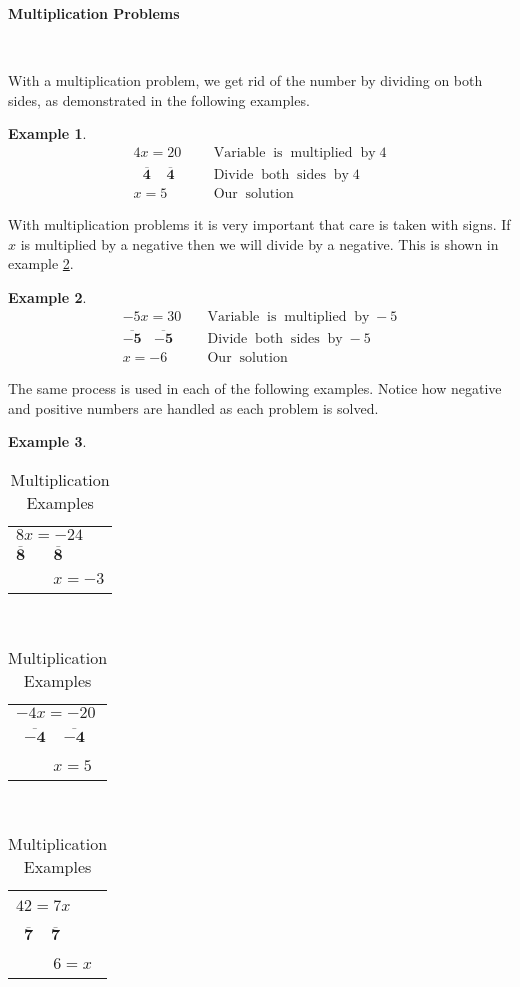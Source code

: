 \documentclass[11pt]{book}
\newcommand{\tmmathbf}[1]{\ensuremath{\boldsymbol{#1}}}
\newcommand{\tmop}[1]{\ensuremath{\operatorname{#1}}}
\theoremstyle{definition}  %
\newtheorem{example}{Example}[chapter]
\begin{document}
{\textbf{Multiplication Problems}}\par
~\par
With a multiplication problem, we get rid of the number by dividing on both
sides, as demonstrated in the following examples.

\begin{example}\label{Lin8}
  \begin{eqnarray*}
    4 x = 20 ~~&  & \tmop{Variable} \tmop{is} \tmop{multiplied} \tmop{by} 4\\
    ~~~\tmmathbf{\overline{4} ~~~~~ \overline{4}}~~ &  & \tmop{Divide} \tmop{both}
    \tmop{sides} \tmop{by} 4\\
    x = 5~~ &  & \tmop{Our} \tmop{solution}
  \end{eqnarray*}
\end{example}

With multiplication problems it is very important that care is taken with
signs. If $x$ is multiplied by a negative then we will divide by a negative.
This is shown in example \ref{Lin9}.

\begin{example}\label{Lin9}
  \begin{eqnarray*}
    - 5 x = 30 &  & \tmop{Variable} \tmop{is} \tmop{multiplied} \tmop{by} -
    5\\
    \tmmathbf{\overline{- 5} ~~~~ \overline{- 5}} &  & \tmop{Divide} \tmop{both}
    \tmop{sides} \tmop{by} - 5\\
    x = - 6 &  & \tmop{Our} \tmop{solution}
  \end{eqnarray*}
\end{example}

The same process is used in each of the following examples. Notice how
negative and positive numbers are handled as each problem is solved.

\begin{example}\label{Lin10}
~\end{example}
 
 \begin{table}[h]
    \begin{tabular}{l}
      $8 x = - 24$\\
      $\tmmathbf{\overline{8} ~~~~~~~~ \overline{8}}$\\
      ~~~~ $x = - 3$
    \end{tabular} \ \ \ \ \ \ \ \ \ \ \ \ \ \ \ \ \ \ \ \begin{tabular}{l}
      $- 4 x = - 20$\\
      \ $\tmmathbf{\overline{- 4} ~~~~~ \overline{- 4}}$\\
      ~~~~ $x = 5$
    \end{tabular} \ \ \ \ \ \ \ \ \ \ \ \ \ \ \ \ \ \ \ \begin{tabular}{l}
      $42 = 7 x$~~\\
      ~$\tmmathbf{\overline{7} ~~~~~ \overline{7}}$\\
      ~~~~ $6 = x$
    \end{tabular}
    \caption{Multiplication Examples}
  \end{table}
\end{document}

